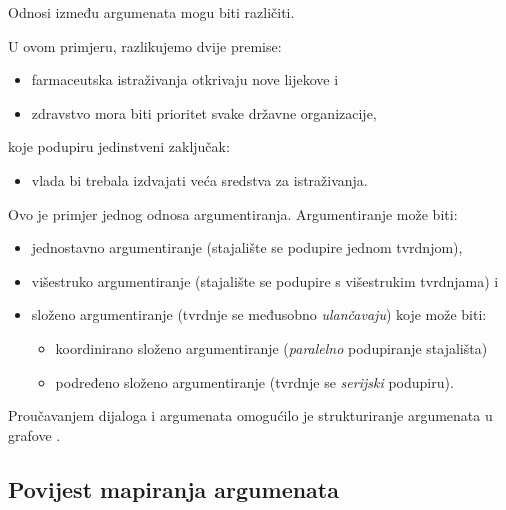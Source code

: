 Odnosi između argumenata mogu biti različiti. 

\vspace{1 mm}


U ovom primjeru, razlikujemo dvije premise:
\begin{itemize}
\item farmaceutska istraživanja otkrivaju nove lijekove i 
\item zdravstvo mora biti prioritet svake državne organizacije,
\end{itemize} 
koje podupiru jedinstveni zaključak: 
\begin{itemize}
\item vlada bi trebala izdvajati veća sredstva za istraživanja.
\end{itemize}

Ovo je primjer jednog odnosa argumentiranja. Argumentiranje može biti:
\begin{itemize}
\label{itemize:naciniarg}
\item jednostavno argumentiranje (stajalište se podupire jednom tvrdnjom), 
\item višestruko argumentiranje (stajalište se podupire s višestrukim tvrdnjama) i
\item složeno argumentiranje (tvrdnje se međusobno \emph{ulančavaju}) koje može biti:
	\begin{itemize}
	\item koordinirano složeno argumentiranje (\emph{paralelno} podupiranje stajališta)
	\item podređeno složeno argumentiranje (tvrdnje se \emph{serijski} podupiru). 
	\end{itemize}
\end{itemize}

Proučavanjem dijaloga i argumenata omogućilo je strukturiranje argumenata u grafove \citep{wolf2006coherence}. 


\subsection{Povijest mapiranja argumenata}


